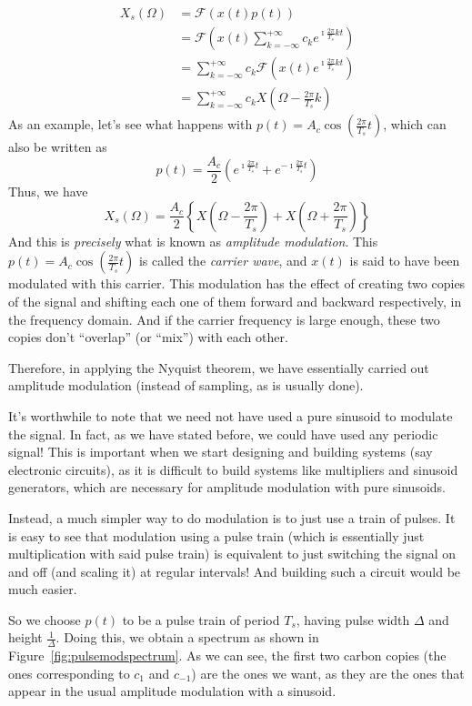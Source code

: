 \begin{align*}
X_s(\Omega)&=\mathcal{F}\left(x(t) p(t)\right)\\
&=\mathcal{F}\left(x(t) \sum\limits_{k=-\infty}^{+\infty} c_k e^{\imath\frac{2\pi}{T_s}kt}\right)\\
&=\sum\limits_{k=-\infty}^{+\infty}c_k\mathcal{F}\left(x(t) e^{\imath\frac{2\pi}{T_s}kt}\right) \tag{$k$ is independent of $t$}\\
&=\sum\limits_{k=-\infty}^{+\infty}c_k X\left(\Omega-\frac{2\pi}{T_s}k\right)
\end{align*}
As an example, let's see what happens with $p(t)=A_c\cos\left(\frac{2\pi}{T_s}t\right)$, which can also be written as
\[p(t)=\frac{A_c}{2}\left(e^{\imath\frac{2\pi}{T_s}t} + e^{-\imath\frac{2\pi}{T_s}t}\right)\]
Thus, we have
\[X_s(\Omega)=\frac{A_c}{2}\left\{ X\left(\Omega-\frac{2\pi}{T_s}\right)+ X\left(\Omega+\frac{2\pi}{T_s}\right)\right\}\]
And this is \emph{precisely} what is known as \emph{amplitude modulation}. This $p(t)=A_c\cos\left(\frac{2\pi}{T_s}t\right)$ is called the \emph{carrier wave}, and $x(t)$ is said to have been modulated with this carrier. This modulation has the effect of creating two copies of the signal and shifting each one of them forward and backward respectively, in the frequency domain. And if the carrier frequency is large enough, these two copies don't ``overlap'' (or ``mix'') with each other.

Therefore, in applying the Nyquist theorem, we have essentially carried out amplitude modulation (instead of sampling, as is usually done).

It's worthwhile to note that we need not have used a pure sinusoid to modulate the signal. In fact, as we have stated before, we could have used any periodic signal! This is important when we start designing and building systems (say electronic circuits), as it is difficult to build systems like multipliers and sinusoid generators, which are necessary for amplitude modulation with pure sinusoids. %

Instead, a much simpler way to do modulation is to just use a train of pulses. It is easy to see that modulation using a pulse train (which is essentially just multiplication with said pulse train) is equivalent to just switching the signal on and off (and scaling it) at regular intervals! And building such a circuit would be much easier.

So we choose $p(t)$ to be a pulse train of period $T_s$, having pulse width $\Delta$ and height $\frac{1}{\Delta}$. Doing this, we obtain a spectrum as shown in Figure~\ref{fig:pulsemodspectrum}. As we can see, the first two carbon copies (the ones corresponding to $c_1$ and $c_{-1}$) are the ones we want, as they are the ones that appear in the usual amplitude modulation with a sinusoid.


